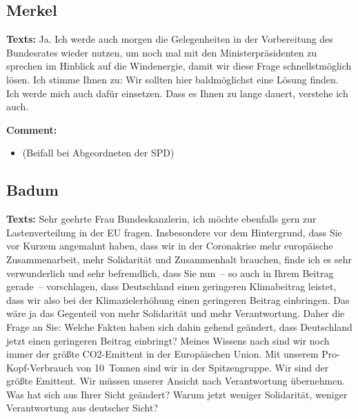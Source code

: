 \documentclass{article}
\begin{document}
\subsection{Merkel}
\noindent\textbf{Texts:} Ja. Ich werde auch morgen die Gelegenheiten in der Vorbereitung des Bundesrates wieder nutzen, um noch mal mit den Ministerpräsidenten zu sprechen im Hinblick auf die Windenergie, damit wir diese Frage schnellstmöglich lösen. Ich stimme Ihnen zu: Wir sollten hier baldmöglichst eine Lösung finden. Ich werde mich auch dafür einsetzen. Dass es Ihnen zu lange dauert, verstehe ich auch. 

\noindent\textbf{Comment:}
\begin{itemize}
    \setlength\itemsep{-3pt}
    \item (Beifall bei Abgeordneten der SPD)
\end{itemize}
\subsection{Badum}
\noindent\textbf{Texts:} Sehr geehrte Frau Bundeskanzlerin, ich möchte ebenfalls gern zur Lastenverteilung in der EU fragen. Insbesondere vor dem Hintergrund, dass Sie vor Kurzem angemahnt haben, dass wir in der Coronakrise mehr europäische Zusammenarbeit, mehr Solidarität und Zusammenhalt brauchen, finde ich es sehr verwunderlich und sehr befremdlich, dass Sie nun – so auch in Ihrem Beitrag gerade – vorschlagen, dass Deutschland einen geringeren Klimabeitrag leistet, dass wir also bei der Klimazielerhöhung einen geringeren Beitrag einbringen. Das wäre ja das Gegenteil von mehr Solidarität und mehr Verantwortung. Daher die Frage an Sie: Welche Fakten haben sich dahin gehend geändert, dass Deutschland jetzt einen geringeren Beitrag einbringt? Meines Wissens nach sind wir noch immer der größte CO2-Emittent in der Europäischen Union. Mit unserem Pro-Kopf-Verbrauch von 10 Tonnen sind wir in der Spitzengruppe. Wir sind der größte Emittent. Wir müssen unserer Ansicht nach Verantwortung übernehmen. Was hat sich aus Ihrer Sicht geändert? Warum jetzt weniger Solidarität, weniger Verantwortung aus deutscher Sicht?
\end{document}
